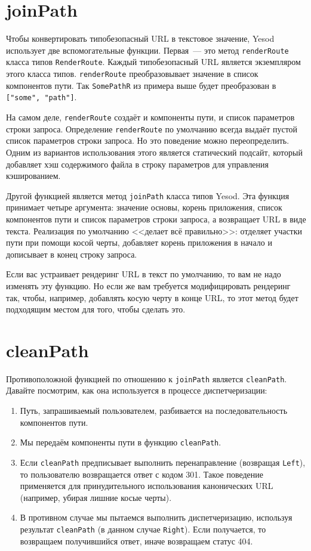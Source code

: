 \section {joinPath}

Чтобы конвертировать типобезопасный URL в текстовое значение, Yesod использует две вспомогательные функции. Первая~--- это метод \lstinline!renderRoute! класса типов \lstinline!RenderRoute!. Каждый типобезопасный URL является экземпляром этого класса типов. \lstinline!renderRoute! преобразовывает значение в список компонентов пути. Так \lstinline!SomePathR! из примера выше будет преобразован в \lstinline!["some", "path"]!.

\begin{remark}
На самом деле, \lstinline!renderRoute! создаёт и компоненты пути, и список параметров строки запроса. Определение \lstinline!renderRoute! по умолчанию всегда выдаёт пустой список параметров строки запроса. Но это поведение можно переопределить. Одним из вариантов использования этого является статический подсайт, который добавляет хэш содержимого файла в строку параметров для управления кэшированием.
\end{remark}

Другой функцией является метод \lstinline!joinPath! класса типов Yesod. Эта функция принимает четыре аргумента: значение основы, корень приложения, список компонентов пути и список параметров строки запроса, а возвращает URL в виде текста. Реализация по умолчанию <<делает всё правильно>>: отделяет участки пути при помощи косой черты, добавляет корень приложения в начало и дописывает в конец строку запроса.

Если вас устраивает рендеринг URL в текст по умолчанию, то вам не надо изменять эту функцию. Но если же вам требуется модифицировать рендеринг так, чтобы, например, добавлять косую черту в конце URL, то этот метод будет подходящим местом для того, чтобы сделать это.

\section {cleanPath}

Противоположной функцией по отношению к \lstinline!joinPath! является \lstinline!cleanPath!. Давайте посмотрим, как она используется в процессе диспетчеризации:

\begin{enumerate}
  \item Путь, запрашиваемый пользователем, разбивается на последовательность компонентов пути.
  \item Мы передаём компоненты пути в функцию \lstinline!cleanPath!.
  \item Если \lstinline!cleanPath! предписывает выполнить перенаправление (возвращая \lstinline!Left!), то пользователю возвращается ответ с кодом 301. Такое поведение применяется для принудительного использования канонических URL (например, убирая лишние косые черты).
  \item В противном случае мы пытаемся выполнить диспетчеризацию, используя результат \lstinline!cleanPath! (в данном случае \lstinline!Right!). Если получается, то возвращаем получившийся ответ, иначе возвращаем статус 404.
\end{enumerate}

